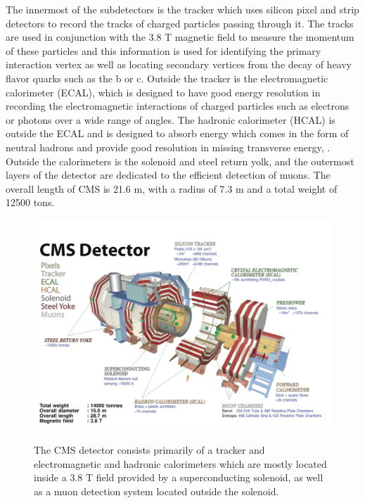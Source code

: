 The innermost of the subdetectors is the tracker
 which uses silicon pixel and strip detectors 
 to record the tracks of charged particles 
 passing through it. 
The tracks are used in conjunction with the
 $3.8$ T magnetic field to measure the momentum of these particles
 and
 this information is used for identifying
 the primary interaction vertex %
 as well as locating secondary vertices 
 from the decay of heavy flavor quarks
 such as the b or c.
Outside the tracker is the electromagnetic calorimeter (ECAL), 
 which is designed to have good energy resolution in recording
 the electromagnetic interactions of charged particles
 such as electrons or photons over a wide range of angles.
The hadronic calorimeter (HCAL) is outside the ECAL
 and is designed to absorb energy which
 comes in the form of neutral hadrons and provide 
 good resolution in missing transverse energy, \met.
Outside the calorimeters is the solenoid and steel return yolk,
 and the outermost layers of the detector are dedicated
 to the efficient detection of muons.
The overall length of CMS is 21.6 m, with a radius of 7.3 m
  and a total weight of 12500 tons.

\begin{figure}[tb]
\caption[The CMS Detector]{
 The CMS detector consists primarily of a tracker
  and electromagnetic and hadronic calorimeters
  which are mostly located inside a 3.8 T field provided
  by a superconducting solenoid,
  as well as a muon detection system located 
  outside the solenoid.
 }
\includegraphics[width=\textwidth]{pdfs/experiment/cms_explode.pdf}
\label{fig:cms_explode}
\end{figure}


